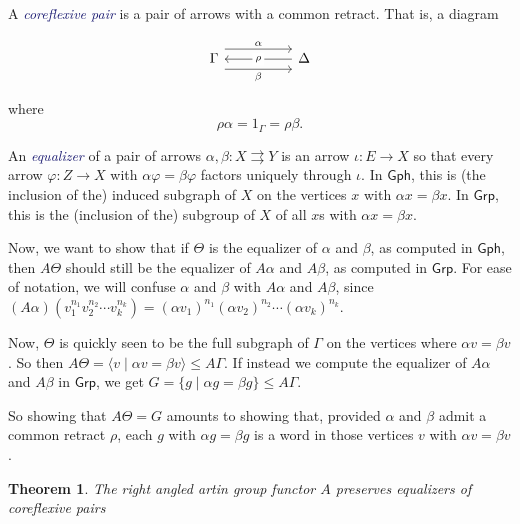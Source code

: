 \documentclass[12pt]{article}
\newtheorem{thm}{Theorem}
\theoremstyle{definition}
\theoremstyle{theorem}
\newcommand*{\catFont}[1]{\mathsf{#1}}
\newcommand{\Grp}{\catFont{Grp}}
\newcommand*{\important}[1]{\textcolor{MidnightBlue}{\emph{#1}}}
\begin{document}
A \important{coreflexive pair} is a pair of arrows with a common retract. 
That is, a diagram

\[\begin{tikzcd}
	\Gamma && \Delta
	\arrow["\alpha", shift left=3, from=1-1, to=1-3]
	\arrow["\beta"', shift right=3, from=1-1, to=1-3]
	\arrow["\rho"{description}, from=1-3, to=1-1]
\end{tikzcd}\]

where \[ \rho \alpha = 1_\Gamma = \rho \beta. \]

An \important{equalizer} of a pair of arrows 
$\alpha, \beta : X \rightrightarrows Y$ is an arrow $\iota : E \to X$
so that every arrow $\varphi : Z \to X$ with $\alpha \varphi = \beta \varphi$ 
factors uniquely through $\iota$. 
In $\mathsf{Gph}$, this is (the inclusion of the) induced subgraph of $X$ 
on the vertices $x$ with $\alpha x = \beta x$. In $\mathsf{Grp}$,
this is the (inclusion of the) subgroup of $X$ of all
$x$s with $\alpha x = \beta x$.

Now, we want to show that if $\Theta$ is the equalizer of $\alpha$ and $\beta$,
as computed in $\mathsf{Gph}$, 
then $A\Theta$ should still be the equalizer of $A \alpha$ and $A \beta$, 
as computed in $\mathsf{Grp}$.
For ease of notation, we will confuse $\alpha$ and $\beta$ with $A \alpha$
and $A \beta$, since 
$(A\alpha)(v_1^{n_1} v_2^{n_2} \cdots v_k^{n_k}) = (\alpha v_1)^{n_1} (\alpha v_2)^{n_2} \cdots (\alpha v_k)^{n_k}$.

Now, $\Theta$ is quickly seen to be the full subgraph of $\Gamma$
on the vertices where $\alpha v = \beta v$. 
So then $A\Theta = \langle v \mid \alpha v = \beta v \rangle \leq A \Gamma$.
If instead we compute the equalizer of $A \alpha$ and $A \beta$ in $\Grp$,
we get $G = \{ g \mid \alpha g = \beta g \} \leq A\Gamma$.

So showing that $A \Theta = G$ amounts to showing that, provided $\alpha$ 
and $\beta$ admit a common retract $\rho$, each $g$ 
with $\alpha g = \beta g$ is a word in those vertices $v$ with $\alpha v = \beta v$.

\begin{thm}
    The right angled artin group functor $A$ preserves equalizers of coreflexive pairs
\end{thm}
\end{document}
